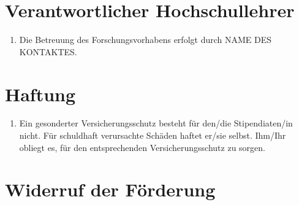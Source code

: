 \documentclass[
  paper=a4,
  fontsize=12pt,
  DIV=16,
  parskip=full,
  headinclude=true,
]{scrartcl}
\begin{document}
\section{Verantwortlicher Hochschullehrer}

\begin{enumerate}[\qquad(1)]
	\item Die Betreuung des Forschungsvorhabens erfolgt durch NAME DES KONTAKTES.
\end{enumerate}

\section{Haftung}

\begin{enumerate}[\qquad(1)]
	\item Ein gesonderter Versicherungsschutz besteht für den/die
		Stipendiaten/in nicht.
		Für schuldhaft verursachte Schäden haftet er/sie selbst.
		Ihm/Ihr obliegt es, für den entsprechenden Versicherungsschutz
		zu sorgen. 
\end{enumerate}

\section{Widerruf der Förderung}
\end{document}
